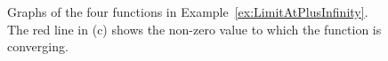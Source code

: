 \begin{figure}[htb]%
\centering
{}%
\centering
{}%
\bigskip
\newline
\centering
{}%
\centering
{}%
    \caption[]{Graphs of the four functions in Example~\ref{ex:LimitAtPlusInfinity}. The red line in (c) shows the non-zero value to which the function is converging.}
    \label{fig:ConvergingToFiniteLimitspart01}
\end{figure}

